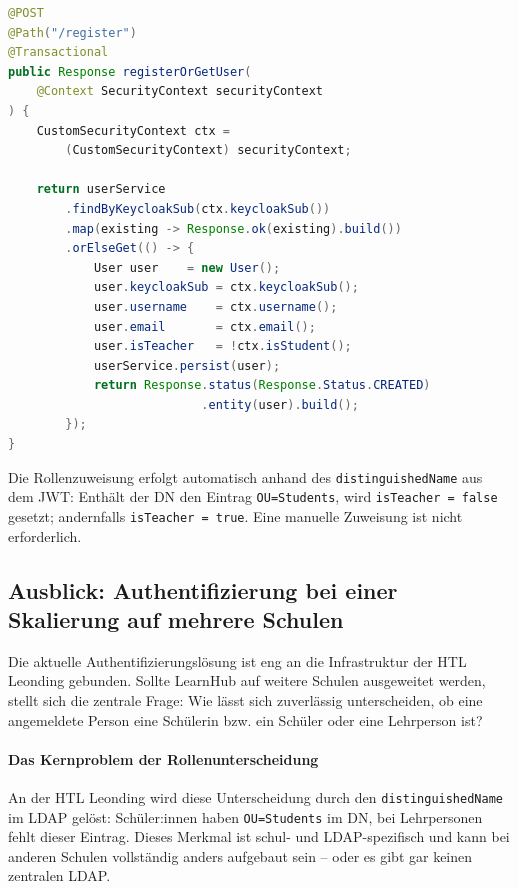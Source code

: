 \begin{lstlisting}[language=Java,
                   caption={User-Registrierung beim ersten Login (UserResource.java)},
                   label={lst:user-register}]
@POST
@Path("/register")
@Transactional
public Response registerOrGetUser(
    @Context SecurityContext securityContext
) {
    CustomSecurityContext ctx =
        (CustomSecurityContext) securityContext;

    return userService
        .findByKeycloakSub(ctx.keycloakSub())
        .map(existing -> Response.ok(existing).build())
        .orElseGet(() -> {
            User user    = new User();
            user.keycloakSub = ctx.keycloakSub();
            user.username    = ctx.username();
            user.email       = ctx.email();
            user.isTeacher   = !ctx.isStudent();
            userService.persist(user);
            return Response.status(Response.Status.CREATED)
                           .entity(user).build();
        });
}
\end{lstlisting}

Die Rollenzuweisung erfolgt automatisch anhand des
\texttt{distinguishedName} aus dem JWT: Enthält der DN den Eintrag
\texttt{OU=Students}, wird \texttt{isTeacher = false} gesetzt;
andernfalls \texttt{isTeacher = true}. Eine manuelle Zuweisung
ist nicht erforderlich.


\subsection{Ausblick: Authentifizierung bei einer Skalierung auf mehrere Schulen}

Die aktuelle Authentifizierungslösung ist eng an die Infrastruktur der
HTL Leonding gebunden. Sollte LearnHub auf weitere Schulen ausgeweitet
werden, stellt sich die zentrale Frage: Wie lässt sich zuverlässig
unterscheiden, ob eine angemeldete Person eine Schülerin bzw. ein
Schüler oder eine Lehrperson ist?

\paragraph{Das Kernproblem der Rollenunterscheidung}

An der HTL Leonding wird diese Unterscheidung durch den
\texttt{distinguishedName} im LDAP gelöst: Schüler:innen haben
\texttt{OU=Students} im DN, bei Lehrpersonen fehlt dieser Eintrag.
Dieses Merkmal ist schul- und LDAP-spezifisch und kann bei anderen
Schulen vollständig anders aufgebaut sein -- oder es gibt gar keinen
zentralen LDAP.

